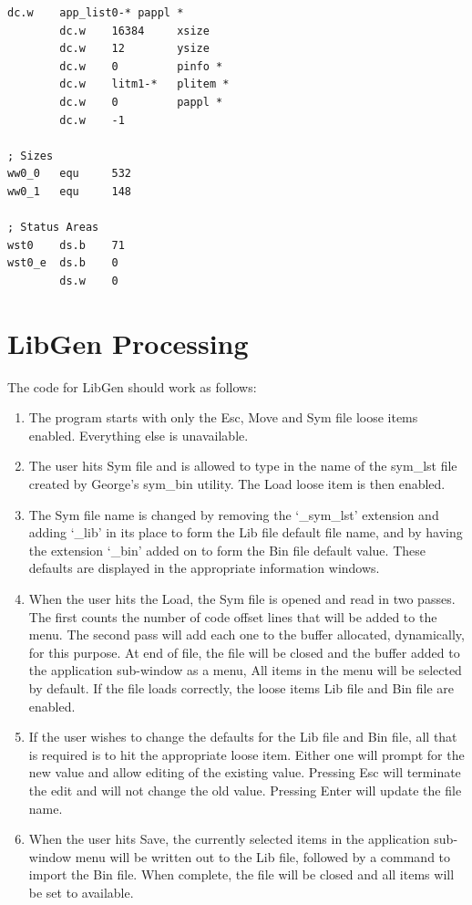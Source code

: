 \begin{lstlisting}[firstnumber=last,caption={LibGenWin\_asm - Remaining Definitions}]
        dc.w    app_list0-* pappl *
        dc.w    16384     xsize
        dc.w    12        ysize
        dc.w    0         pinfo *
        dc.w    litm1-*   plitem *
        dc.w    0         pappl *
        dc.w    -1

; Sizes
ww0_0   equ     532
ww0_1   equ     148

; Status Areas
wst0    ds.b    71
wst0_e  ds.b    0
        ds.w    0
\end{lstlisting}

\section{LibGen Processing}
\label{ch31-lib-gen-processing}%

The code for LibGen should work as
    follows:
\begin{enumerate}
\item{The program starts with only the Esc, Move and Sym file
        loose items enabled. Everything else is unavailable.
}
\item{The user hits Sym file and is allowed to type in the name of
        the sym\_lst file created by George's
 sym\_bin utility. The Load loose item is
        then enabled.
}
\item{The Sym file name is changed by removing the `\_sym\_lst'
        extension and adding `\_lib' in its place to form the Lib file
        default file name, and by having the extension `\_bin' added on to form
        the Bin file default value. These defaults are displayed in the
        appropriate information windows.
}
\item{When the user hits the Load, the Sym file is opened and read
        in two passes. The first counts the number of code offset lines that
        will be added to the menu. The second pass will add each one to the
        buffer allocated, dynamically, for this purpose. At end of file, the
        file will be closed and the buffer added to the application sub-{}window
        as a menu, All items in the menu will be selected by default. If the
        file loads correctly, the loose items Lib file and Bin file are
        enabled.
}
\item{If the user wishes to change the defaults for the Lib file and
        Bin file, all that is required is to hit the appropriate loose item.
        Either one will prompt for the new value and allow editing of the
        existing value. Pressing Esc will terminate the edit and will not
        change the old value. Pressing Enter will update the file name.
}
\item{When the user hits Save, the currently selected items in the
        application sub-{}window menu will be written out to the Lib file,
        followed by a command to import the Bin file. When complete, the
        file will be closed and all items will be set to available.
}
\end{enumerate}

